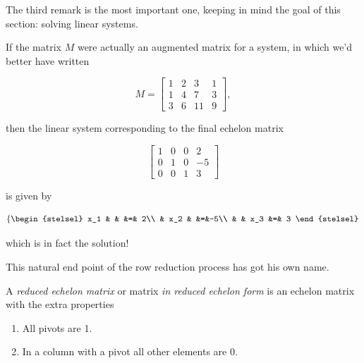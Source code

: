 The third remark is the most important one, keeping in mind the goal of this section:  solving linear systems.

\begin{rem}
\label{Rem:LinSystems:SolutionFromRREF}
If the matrix $M$
 were actually an augmented matrix for a system, in which we'd better have written
 
$$

    M = \left[
\begin{array}{rrr|r} 1 & 2 & 3 & 1\\ 1 & 4 & 7 & 3\\ 3 & 6 & 11 & 9
       \end{array}\right],
 $$

 then the linear system corresponding to the final echelon matrix

$$

    \left[
\begin{array}{rrr|r} 1 &0  & 0 & 2\\ 0 & 1 & 0 & -5\\ 0 & 0 & 1 & 3
       \end{array}\right]
$$

is given by

$$

 \left\{
    \begin{stelsel}
          x_1 &     &     &=& 2\\
              & x_2 &     &=&-5\\
              &     & x_3 &=& 3
    \end{stelsel}
   \right.
$$

which is in fact the solution!
\end{rem}


This natural end point of the row reduction process has got his own name.

\begin{dfn}
\label{Dfn:LinSystems:ReducedEchelonMatrix}
A \emph{reduced echelon matrix} or matrix \emph{in reduced echelon form} is an echelon matrix with the extra properties

\begin{enumerate}[label=(\roman*)]
\item All pivots are 1.
\item In a column with a pivot all other elements are 0.
\end{enumerate}

\end{dfn}



